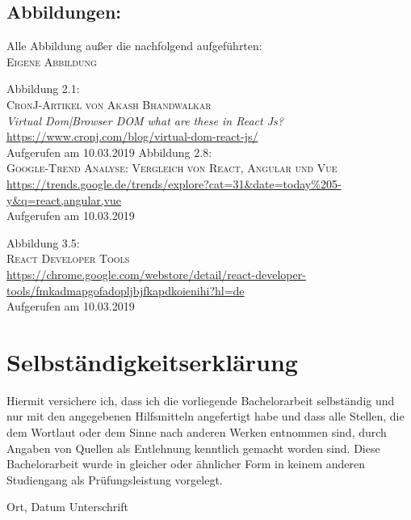 \documentclass[twoside,12pt,a4paper]{report}
\begin{document}
\begin{thebibliography}{9}
  \clearpage
  \section*{Abbildungen:}
  Alle Abbildung außer die nachfolgend aufgeführten:\\
  \textsc{Eigene Abbildung}

  Abbildung 2.1:\\
  \textsc{CronJ-Artikel von Akash Bhandwalkar}\\
  \textit{Virtual Dom|Browser DOM what are these in React Js?}\\
  \href{https://www.cronj.com/blog/virtual-dom-react-js/}{https://www.cronj.com/blog/virtual-dom-react-js/}\\
  Aufgerufen am 10.03.2019
  Abbildung 2.8:\\
  \textsc{Google-Trend Analyse: Vergleich von React, Angular und Vue}\\
  \href{https://trends.google.de/trends/explore?cat=31&date=today%205-y&q=react,angular,vue}{https://trends.google.de/trends/explore?cat=31\&date=today\%205-y\&q=react,angular,vue}\\
  Aufgerufen am 10.03.2019

  Abbildung 3.5:\\
  \textsc{React Developer Tools}\\
  \href{https://chrome.google.com/webstore/detail/react-developer-tools/fmkadmapgofadopljbjfkapdkoienihi?hl=de}{https://chrome.google.com/webstore/detail/react-developer-tools/fmkadmapgofadopljbjfkapdkoienihi?hl=de}\\
  Aufgerufen am 10.03.2019


\end{thebibliography}



\clearpage

\thispagestyle{empty}
\section*{Selbst\"andigkeitserkl\"arung}

Hiermit versichere ich, dass ich die vorliegende Bachelorarbeit 
selbst\"andig und nur mit den angegebenen Hilfsmitteln angefertigt habe und dass alle Stellen, die dem Wortlaut oder dem 
Sinne nach anderen Werken entnommen sind, durch Angaben von Quellen als 
Entlehnung kenntlich gemacht worden sind. 
Diese Bachelorarbeit wurde in gleicher oder \"ahnlicher Form in keinem anderen 
Studiengang als Pr\"ufungsleistung vorgelegt. 

\vskip 3cm

Ort, Datum	\hfill Unterschrift \hfill 
\end{document}
